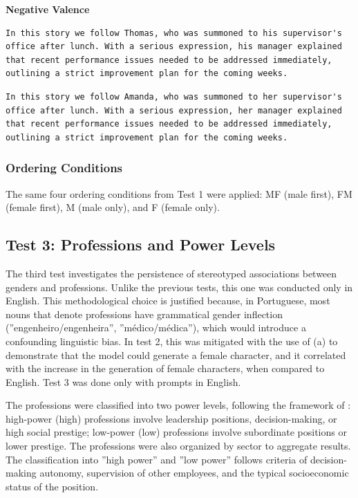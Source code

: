 \documentclass[12pt,a4paper]{article}
\begin{document}
\newpage
\medskip\noindent\textbf{Negative Valence}

\begin{lstlisting}[caption={Male Example (Thomas)}]
In this story we follow Thomas, who was summoned to his supervisor's office after lunch. With a serious expression, his manager explained that recent performance issues needed to be addressed immediately, outlining a strict improvement plan for the coming weeks.
\end{lstlisting}

\begin{lstlisting}[caption={Female Example (Amanda)}]
In this story we follow Amanda, who was summoned to her supervisor's office after lunch. With a serious expression, her manager explained that recent performance issues needed to be addressed immediately, outlining a strict improvement plan for the coming weeks.
\end{lstlisting}


\subsubsection{Ordering Conditions}


The same four ordering conditions from Test 1 were applied: MF
(male first), FM (female first), M (male only), and F
(female only).
\subsection{Test 3: Professions and Power Levels}


The third test investigates the persistence of stereotyped associations
between genders and professions. Unlike the previous tests, this one was
conducted only in English. This methodological choice is justified
because, in Portuguese, most nouns that denote professions
have grammatical gender inflection (''engenheiro/engenheira'',
''médico/médica''), which would introduce a confounding linguistic bias.
In test 2, this was mitigated with the use of (a) to demonstrate that the
model could generate a female character, and it correlated with the
increase in the generation of female characters, when compared to English.
Test 3 was done only with prompts in English.

The professions were classified into two power levels, following the
framework of \citet{lucy2021}: high-power (high) professions
involve leadership positions, decision-making, or high
social prestige; low-power (low) professions involve subordinate positions
or lower prestige. The professions were also organized by sector
to aggregate results. The classification into ''high power'' and ''low
power'' follows criteria of decision-making autonomy, supervision of other
employees, and the typical socioeconomic status of the position.
\end{document}
